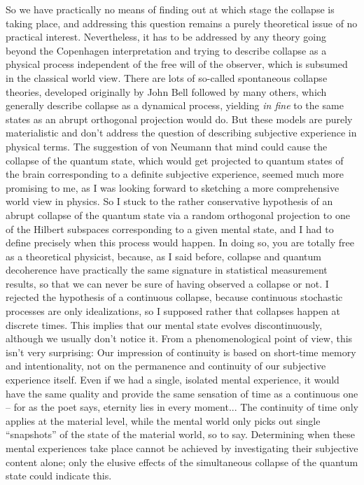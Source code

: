 So we have practically no means of finding out at which stage the collapse is taking place, and addressing this question remains a purely theoretical issue of no practical interest.
Nevertheless, it has to be addressed by any theory going beyond the Copenhagen interpretation and trying to describe collapse as a physical process independent of the free will of the observer, which is subsumed in the classical world view.
There are lots of so-called spontaneous collapse theories, developed originally by John Bell followed by many others, which generally describe collapse as a dynamical process, yielding \textit{in fine} to the same states as an abrupt orthogonal projection would do.
But these models are purely materialistic and don't address the question of describing subjective experience in physical terms.
The suggestion of von Neumann that mind could cause the collapse of the quantum state, which would get projected to quantum states of the brain corresponding to a definite subjective experience, seemed much more promising to me, as I was looking forward to sketching a more comprehensive world view in physics.
So I stuck to the rather conservative hypothesis of an abrupt collapse of the quantum state via a random orthogonal projection to one of the Hilbert subspaces corresponding to a given mental state, and I had to define precisely when this process would happen.
In doing so, you are totally free as a theoretical physicist, because, as I said before, collapse and quantum decoherence have practically the same signature in statistical measurement results, so that we can never be sure of having observed a collapse or not.
I rejected the hypothesis of a continuous collapse, because continuous stochastic processes are only idealizations, so I supposed rather that collapses happen at discrete times.
This implies that our mental state evolves discontinuously, although we usually don't notice it.
From a phenomenological point of view, this isn't very surprising: Our impression of continuity is based on short-time memory and intentionality, not on the permanence and continuity of our subjective experience itself.
Even if we had a single, isolated mental experience, it would have the same quality and provide the same sensation of time as a continuous one -- for as the poet says, eternity lies in every moment...
The continuity of time only applies at the material level, while the mental world only picks out single ``snapshots'' of the state of the material world, so to say.
Determining when these mental experiences take place cannot be achieved by investigating their subjective content alone; only the elusive effects of the simultaneous collapse of the quantum state could indicate this.

